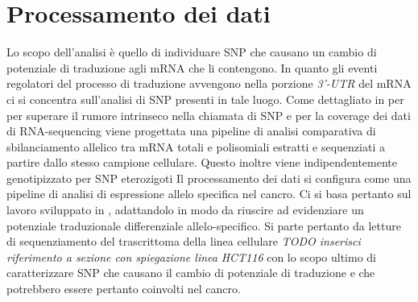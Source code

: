 \graphicspath{{chapters/03/media/}}
\chapter{Processamento dei dati}
\label{cha:processamento}
Lo scopo dell'analisi \`e quello di individuare SNP che causano un cambio di potenziale di traduzione agli mRNA che li contengono.
In quanto gli eventi regolatori del processo di traduzione avvengono nella porzione \emph{3'-UTR} del mRNA ci si concentra sull'analisi di SNP presenti in tale luogo.
Come dettagliato in \cite{trans_snp} per per superare il rumore intrinseco nella chiamata di SNP e per la coverage dei dati di RNA-sequencing viene progettata una pipeline di analisi comparativa di sbilanciamento allelico tra mRNA totali e polisomiali estratti e sequenziati a partire dallo stesso campione cellulare.
Questo inoltre viene indipendentemente genotipizzato per SNP eterozigoti
Il processamento dei dati si configura come una pipeline di analisi di espressione allelo specifica nel cancro.
Ci si basa pertanto sul lavoro sviluppato in \cite{ase_pipeline}, adattandolo in modo da riuscire ad evidenziare un potenziale traduzionale differenziale allelo-specifico.
Si parte pertanto da letture di sequenziamento del trascrittoma della linea cellulare \emph{TODO inserisci riferimento a sezione con spiegazione linea} \emph{HCT116} con lo scopo ultimo di caratterizzare SNP che causano il cambio di potenziale di traduzione e che potrebbero essere pertanto coinvolti nel cancro.

